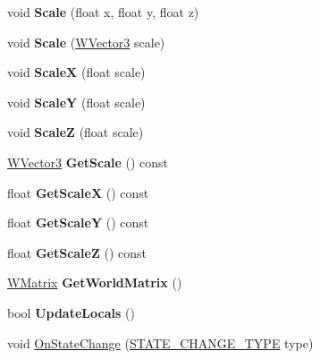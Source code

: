 \begin{DoxyCompactItemize}
\item 
void {\bfseries Scale} (float x, float y, float z)\hypertarget{class_w_instance_aa5805787cddfa9b07e2b5c945f8bdc47}{}\label{class_w_instance_aa5805787cddfa9b07e2b5c945f8bdc47}

\item 
void {\bfseries Scale} (\hyperlink{class_w_vector3}{W\+Vector3} scale)\hypertarget{class_w_instance_aac983d6b3507de1f9a97c603320d633f}{}\label{class_w_instance_aac983d6b3507de1f9a97c603320d633f}

\item 
void {\bfseries ScaleX} (float scale)\hypertarget{class_w_instance_aa9fbf63a71d78a199e0b3facccbb1ad7}{}\label{class_w_instance_aa9fbf63a71d78a199e0b3facccbb1ad7}

\item 
void {\bfseries ScaleY} (float scale)\hypertarget{class_w_instance_a0385d63300222ba93fea63748da532b5}{}\label{class_w_instance_a0385d63300222ba93fea63748da532b5}

\item 
void {\bfseries ScaleZ} (float scale)\hypertarget{class_w_instance_a5d9dababc48b4d9d2da5abbd3e37e2bb}{}\label{class_w_instance_a5d9dababc48b4d9d2da5abbd3e37e2bb}

\item 
\hyperlink{class_w_vector3}{W\+Vector3} {\bfseries Get\+Scale} () const \hypertarget{class_w_instance_a71da0f88552efb188071756d60f55184}{}\label{class_w_instance_a71da0f88552efb188071756d60f55184}

\item 
float {\bfseries Get\+ScaleX} () const \hypertarget{class_w_instance_a99fcf062ff407173e0084442843149f1}{}\label{class_w_instance_a99fcf062ff407173e0084442843149f1}

\item 
float {\bfseries Get\+ScaleY} () const \hypertarget{class_w_instance_ae0591cf821d8965b94e9d09d6fd829af}{}\label{class_w_instance_ae0591cf821d8965b94e9d09d6fd829af}

\item 
float {\bfseries Get\+ScaleZ} () const \hypertarget{class_w_instance_a924f7ce994f009850174f22a92be686c}{}\label{class_w_instance_a924f7ce994f009850174f22a92be686c}

\item 
\hyperlink{class_w_matrix}{W\+Matrix} {\bfseries Get\+World\+Matrix} ()\hypertarget{class_w_instance_a9a7c34683f6ca07c4a337264bb84d4cc}{}\label{class_w_instance_a9a7c34683f6ca07c4a337264bb84d4cc}

\item 
bool {\bfseries Update\+Locals} ()\hypertarget{class_w_instance_ae3c1714ea89b18160cc282dcd6476d14}{}\label{class_w_instance_ae3c1714ea89b18160cc282dcd6476d14}

\item 
void \hyperlink{class_w_instance_a30c34ae4cf3146852c9d35eeef993118}{On\+State\+Change} (\hyperlink{_w_orientation_8h_afe94de0a48bbd7b343ab18bc318cef28}{S\+T\+A\+T\+E\+\_\+\+C\+H\+A\+N\+G\+E\+\_\+\+T\+Y\+PE} type)
\end{DoxyCompactItemize}
